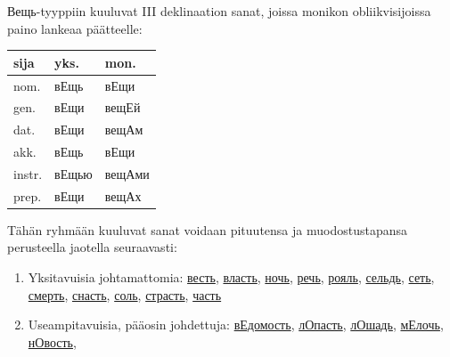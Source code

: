 \documentclass[]{scrartcl}
\providecommand{\tightlist}{%
  \setlength{\itemsep}{0pt}\setlength{\parskip}{0pt}}
\begin{document}
Вещь-tyyppiin kuuluvat III deklinaation sanat, joissa monikon
obliikvisijoissa paino lankeaa päätteelle:

\begin{longtable}[c]{@{}lll@{}}
\toprule
sija & yks. & mon.\tabularnewline
\midrule
\endhead
nom. & вЕщь & вЕщи\tabularnewline
gen. & вЕщи & вещЕй\tabularnewline
dat. & вЕщи & вещАм\tabularnewline
akk. & вЕщь & вЕщи\tabularnewline
instr. & вЕщью & вещАми\tabularnewline
prep. & вЕщи & вещАх\tabularnewline
\bottomrule
\end{longtable}

Tähän ryhmään kuuluvat sanat voidaan pituutensa ja muodostustapansa
perusteella jaotella seuraavasti:

\begin{enumerate}
\def\labelenumi{\arabic{enumi}.}
\tightlist
\item
  Yksitavuisia johtamattomia:
  \href{http://ru.wiktionary.org/wiki/\%D0\%B2\%D0\%B5\%D1\%81\%D1\%82\%D1\%8C}{весть},
  \href{http://ru.wiktionary.org/wiki/\%D0\%B2\%D0\%BB\%D0\%B0\%D1\%81\%D1\%82\%D1\%8C}{власть},
  \href{http://ru.wiktionary.org/wiki/\%D0\%BD\%D0\%BE\%D1\%87\%D1\%8C}{ночь},
  \href{http://ru.wiktionary.org/wiki/\%D1\%80\%D0\%B5\%D1\%87\%D1\%8C}{речь},
  \href{http://ru.wiktionary.org/wiki/\%D1\%80\%D0\%BE\%D1\%8F\%D0\%BB\%D1\%8C}{рояль},
  \href{http://ru.wiktionary.org/wiki/\%D1\%81\%D0\%B5\%D0\%BB\%D1\%8C\%D0\%B4\%D1\%8C}{сельдь},
  \href{http://ru.wiktionary.org/wiki/\%D1\%81\%D0\%B5\%D1\%82\%D1\%8C}{сеть},
  \href{http://ru.wiktionary.org/wiki/\%D1\%81\%D0\%BC\%D0\%B5\%D1\%80\%D1\%82\%D1\%8C}{смерть},
  \href{http://ru.wiktionary.org/wiki/\%D1\%81\%D0\%BD\%D0\%B0\%D1\%81\%D1\%82\%D1\%8C}{снасть},
  \href{http://ru.wiktionary.org/wiki/\%D1\%81\%D0\%BE\%D0\%BB\%D1\%8C}{соль},
  \href{http://ru.wiktionary.org/wiki/\%D1\%81\%D1\%82\%D1\%80\%D0\%B0\%D1\%81\%D1\%82\%D1\%8C}{страсть},
  \href{http://ru.wiktionary.org/wiki/\%D1\%87\%D0\%B0\%D1\%81\%D1\%82\%D1\%8C}{часть}
\item
  Useampitavuisia, pääosin johdettuja:
  \href{http://ru.wiktionary.org/wiki/\%D0\%B2\%D0\%B5\%D0\%B4\%D0\%BE\%D0\%BC\%D0\%BE\%D1\%81\%D1\%82\%D1\%8C}{вЕдомость},
  \href{http://ru.wiktionary.org/wiki/\%D0\%BB\%D0\%BE\%D0\%BF\%D0\%B0\%D1\%81\%D1\%82\%D1\%8C}{лОпасть},
  \href{http://ru.wiktionary.org/wiki/\%D0\%BB\%D0\%BE\%D1\%88\%D0\%B0\%D0\%B4\%D1\%8C}{лОшадь},
  \href{http://ru.wiktionary.org/wiki/\%D0\%BC\%D0\%B5\%D0\%BB\%D0\%BE\%D1\%87\%D1\%8C}{мЕлочь},
  \href{http://ru.wiktionary.org/wiki/\%D0\%BD\%D0\%BE\%D0\%B2\%D0\%BE\%D1\%81\%D1\%82\%D1\%8C}{нОвость},

\end{enumerate}
\end{document}
